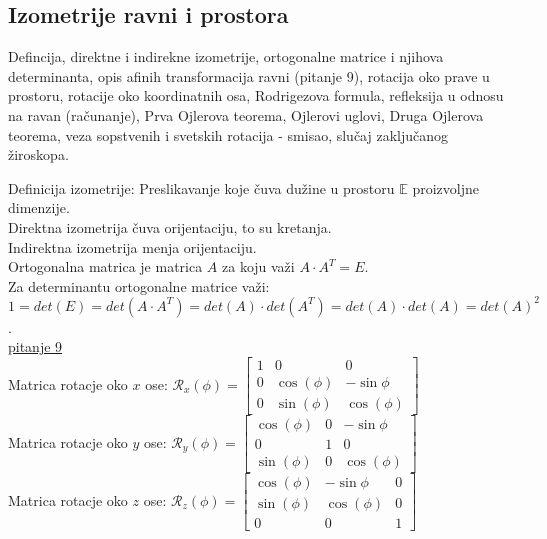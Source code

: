 \documentclass[12pt]{article}
\begin{document}
    \subsection{Izometrije ravni i prostora}
    Defincija, direktne i indirekne izometrije, ortogonalne
    matrice i njihova determinanta, opis afinih transformacija
    ravni (pitanje 9), rotacija oko prave u prostoru, rotacije
    oko koordinatnih osa, Rodrigezova formula, refleksija u
    odnosu na ravan (računanje), Prva Ojlerova teorema,
    Ojlerovi uglovi, Druga Ojlerova teorema, veza sopstvenih i
    svetskih rotacija - smisao, slučaj zaključanog žiroskopa.\par

    \vspace*{1cm}

    Definicija izometrije: Preslikavanje koje čuva dužine u prostoru
$\mathbb{E}$ proizvoljne dimenzije.\\
    Direktna izometrija čuva orijentaciju, to su kretanja.\\
    Indirektna izometrija menja orijentaciju.\\
    Ortogonalna matrica je matrica $A$ za koju važi $A\cdot A^T=E$.\\
    Za determinantu ortogonalne matrice važi:\\
$1=det(E)=det(A\cdot A^T)=det(A)\cdot det(A^T)=det(A)\cdot det(A)=det(A)^2$.\\
    \hyperref[subsec:pitanje_9]{pitanje 9}\\
    Matrica rotacje oko $x$ ose: $\mathcal{R}_x(\phi)=\begin{bmatrix}
    1 & 0          & 0           \\
    0 & \cos(\phi) & -\sin{\phi} \\
    0 & \sin(\phi) & \cos(\phi)
\end{bmatrix}$\\[0.5cm]
    Matrica rotacje oko $y$ ose: $\mathcal{R}_y(\phi)=\begin{bmatrix}
    \cos(\phi) & 0 & -\sin{\phi} \\
    0          & 1 & 0           \\
    \sin(\phi) & 0 & \cos(\phi)
\end{bmatrix}$\\[0.5cm]
    Matrica rotacje oko $z$ ose: $\mathcal{R}_z(\phi)=\begin{bmatrix}
    \cos(\phi) & -\sin{\phi} & 0 \\
    \sin(\phi) & \cos(\phi)  & 0 \\
    0          & 0           & 1
\end{bmatrix}$\\[0.5cm]
\end{document}

